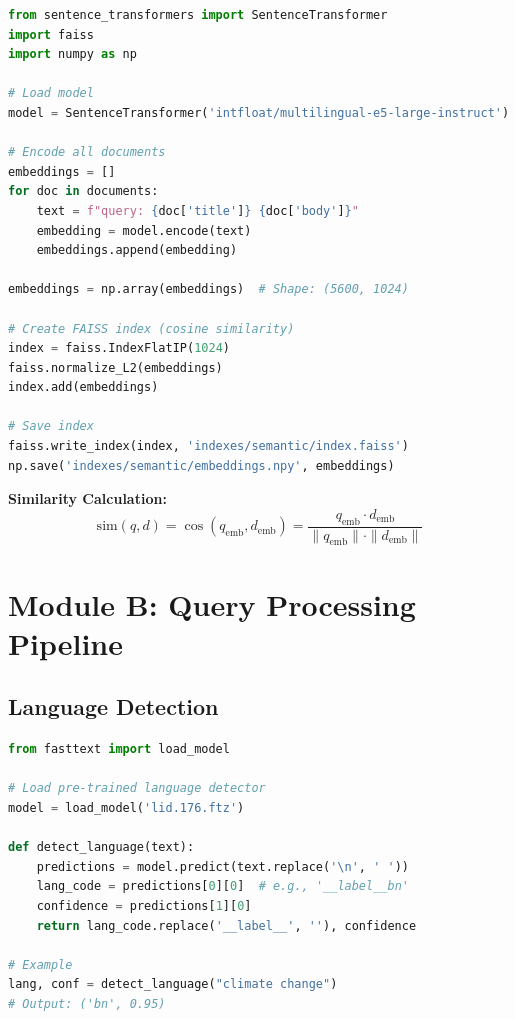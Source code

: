 \documentclass[12pt,a4paper]{report}
\begin{document}
\begin{lstlisting}[language=Python, caption=Semantic Index with mE5]
from sentence_transformers import SentenceTransformer
import faiss
import numpy as np

# Load model
model = SentenceTransformer('intfloat/multilingual-e5-large-instruct')

# Encode all documents
embeddings = []
for doc in documents:
    text = f"query: {doc['title']} {doc['body']}"
    embedding = model.encode(text)
    embeddings.append(embedding)

embeddings = np.array(embeddings)  # Shape: (5600, 1024)

# Create FAISS index (cosine similarity)
index = faiss.IndexFlatIP(1024)
faiss.normalize_L2(embeddings)
index.add(embeddings)

# Save index
faiss.write_index(index, 'indexes/semantic/index.faiss')
np.save('indexes/semantic/embeddings.npy', embeddings)
\end{lstlisting}

\textbf{Similarity Calculation:}
\begin{equation}
\text{sim}(q, d) = \cos(q_{\text{emb}}, d_{\text{emb}}) = \frac{q_{\text{emb}} \cdot d_{\text{emb}}}{\|q_{\text{emb}}\| \cdot \|d_{\text{emb}}\|}
\end{equation}

\section{Module B: Query Processing Pipeline}

\subsection{Language Detection}

\begin{lstlisting}[language=Python, caption=Language Detection]
from fasttext import load_model

# Load pre-trained language detector
model = load_model('lid.176.ftz')

def detect_language(text):
    predictions = model.predict(text.replace('\n', ' '))
    lang_code = predictions[0][0]  # e.g., '__label__bn'
    confidence = predictions[1][0]
    return lang_code.replace('__label__', ''), confidence

# Example
lang, conf = detect_language("climate change")
# Output: ('bn', 0.95)
\end{lstlisting}
\end{document}
